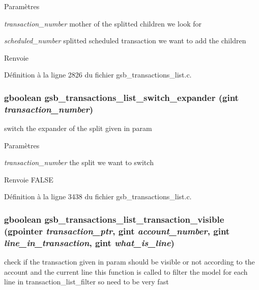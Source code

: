 \begin{DoxyParams}{Paramètres}
\item[{\em transaction\_\-number}]mother of the splitted children we look for \item[{\em scheduled\_\-number}]splitted scheduled transaction we want to add the children\end{DoxyParams}
\begin{DoxyReturn}{Renvoie}

\end{DoxyReturn}


Définition à la ligne 2826 du fichier gsb\_\-transactions\_\-list.c.

\subsubsection[{gsb\_\-transactions\_\-list\_\-switch\_\-expander}]{\setlength{\rightskip}{0pt plus 5cm}gboolean gsb\_\-transactions\_\-list\_\-switch\_\-expander (gint {\em transaction\_\-number})}\label{gsb__transactions__list_8h_a6089f07015c6278f5d0a689783fe4019}
switch the expander of the split given in param


\begin{DoxyParams}{Paramètres}
\item[{\em transaction\_\-number}]the split we want to switch\end{DoxyParams}
\begin{DoxyReturn}{Renvoie}
FALSE 
\end{DoxyReturn}


Définition à la ligne 3438 du fichier gsb\_\-transactions\_\-list.c.

\subsubsection[{gsb\_\-transactions\_\-list\_\-transaction\_\-visible}]{\setlength{\rightskip}{0pt plus 5cm}gboolean gsb\_\-transactions\_\-list\_\-transaction\_\-visible (gpointer {\em transaction\_\-ptr}, \/  gint {\em account\_\-number}, \/  gint {\em line\_\-in\_\-transaction}, \/  gint {\em what\_\-is\_\-line})}\label{gsb__transactions__list_8h_a3fea90bc90cbcb2b613935cb657fd320}
check if the transaction given in param should be visible or not according to the account and the current line this function is called to filter the model for each line in transaction\_\-list\_\-filter so need to be very fast


